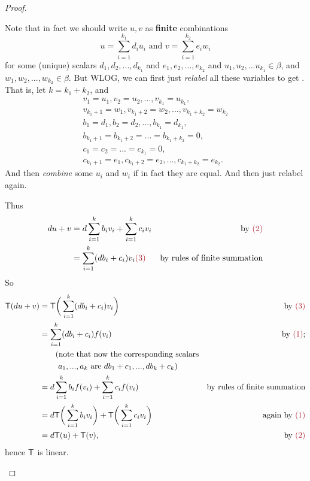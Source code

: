 \begin{proof}
\begin{enumerate}
Note that in fact we should write \(u, v\) as \textbf{finite} combinations
\[
    u = \sum_{i = 1}^{k_1} d_i u_i \text{ and } v = \sum_{i = 1}^{k_2} e_i w_i
\]
for some (unique) scalars \(d_1, d_2, ..., d_{k_1}\) and \(e_1, e_2, ..., e_{k_2}\) and \(u_1, u_2, ... u_{k_1} \in \beta\), and \(w_1, w_2, ..., w_{k_2} \in \beta\).
But WLOG, we can first just \emph{relabel} all these variables to get .
That is, let \(k = k_1 + k_2\), and
\begin{align*}
    v_1 = u_1, v_2 = u_2, ..., v_{k_1} = u_{k_1}, \\
    v_{k_1 + 1} = w_1, v_{k_1 + 2} = w_2, ..., v_{k_1 + k_2} = w_{k_2} \\
    b_1 = d_1, b_2 = d_2, ..., b_{k_1} = d_{k_1}, \\
    b_{k_1 + 1} = b_{k_1 + 2} = ... = b_{k_1 + k_2} = 0, \\
    c_1 = c_2 = ... = c_{k_1} = 0, \\
    c_{k_1 + 1} = e_1, c_{k_1 + 2} = e_2, ..., c_{k_1 + k_2} = e_{k_2}.
\end{align*}
And then \emph{combine} some \(u_i\) and \(w_i\) if in fact they are equal.
And then just relabel again.

Thus
\begin{align*}
    d u + v & = d \sum_{i = 1}^{k} b_i v_i + \sum_{i = 1}^{k} c_i v_i & \text{by \MAROON{(2)}} \\
            & = \sum_{i = 1}^k (db_i + c_i) v_i \MAROON{(3)} & \text{by rules of finite summation}
\end{align*}
So
\begin{align*}
    \T(du + v) & = \T\bigg( \sum_{i = 1}^k (db_i + c_i) v_i \bigg) & \text{by \MAROON{(3)}} \\
               & = \sum_{i = 1}^k (db_i + c_i) f(v_i) & \text{by \MAROON{(1)};} \\
               & \text{\ \ \ \ \ \ (note that now the corresponding scalars} \\
               & \text{\ \ \ \ \ \ \ \(a_1, ..., a_k\) are \(d b_1 + c_1, ..., d b_k + c_k\))} \\
               & = d \sum_{i = 1}^k b_i f(v_i) + \sum_{i = 1}^k c_i f(v_i) & \text{by rules of finite summation} \\
               & = d \T\bigg( \sum_{i = 1}^k b_i v_i \bigg) + \T\bigg( \sum_{i = 1}^k c_i v_i \bigg) & \text{again by \MAROON{(1)}} \\
               & = d \T(u) + \T(v), & \text{by \MAROON{(2)}}
\end{align*}
hence \(\textsf{T}\) is linear.


\end{enumerate}
\end{proof}
